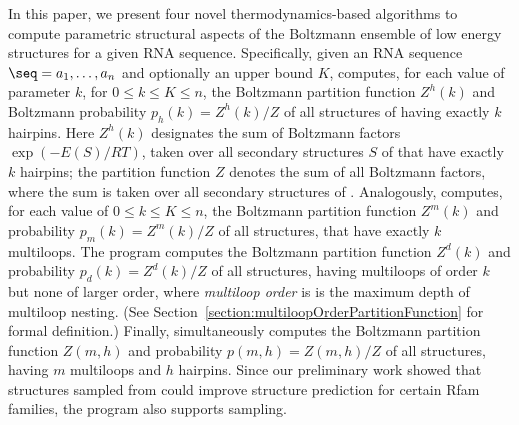 In this paper, we present four novel
thermodynamics-based algorithms to compute parametric structural aspects of the
Boltzmann ensemble of low energy structures for a given RNA sequence.
Specifically, given an RNA sequence $\seq =a_1,\ldots,a_n$ and
optionally an upper bound $K$, {\rnahairpin} computes, for each value of
parameter $k$, for $0 \leq k \leq K \leq n$, the Boltzmann partition
function $Z^h(k)$ and
Boltzmann probability $p_h(k) = Z^h(k)/Z$ of all structures  of \seq having
exactly $k$ hairpins. Here $Z^h(k)$ designates the sum of Boltzmann factors
$\exp(-E(S)/RT)$, taken over all
secondary structures $S$ of \seq that have exactly $k$ hairpins; the
partition function $Z$ denotes the sum of all Boltzmann factors, where the
sum is taken over all secondary structures of \seq. Analogously,
{\rnamlnumber} computes, for each value of $0 \leq k \leq K \leq n$,
the Boltzmann partition function $Z^m(k)$ and probability
$p_m(k) = Z^m(k)/Z$ of all structures, that have exactly $k$
multiloops.
The program {\rnamlorder} computes the
Boltzmann partition function $Z^d(k)$ and probability
$p_d(k) = Z^d(k)/Z$ of all structures, having multiloops of order
$k$ but none of larger order, where {\em multiloop order} is
is the maximum depth of multiloop nesting.
(See Section~\ref{section:multiloopOrderPartitionFunction} for
formal definition.)
Finally, {\rnahairpinml} simultaneously computes the
Boltzmann partition function $Z(m,h)$ and probability
$p(m,h) = Z(m,h)/Z$ of all structures, having $m$ multiloops and
$h$ hairpins. Since our preliminary work showed that structures sampled
from {\rnahairpin} could improve structure prediction for certain Rfam
families, the program {\rnahairpinml} also supports sampling.

